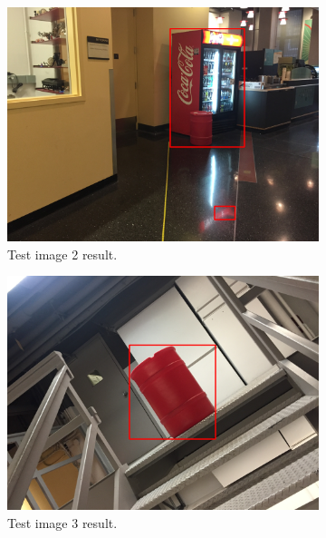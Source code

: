 \documentclass[a4paper]{article}
\begin{document}
\begin{figure}[!tbp]
  \centering
  \begin{subfigure}[b]{.4\textwidth}
    \includegraphics[width=1\textwidth]{test_image2.png}
\caption{\label{fig:test2}Test image 2 result.}
  \end{subfigure}
  \begin{subfigure}[b]{.4\textwidth}
    \includegraphics[width=1\textwidth]{test_image3.png}
\caption{\label{fig:test3}Test image 3 result.}
  \end{subfigure}
  \caption{\label{fig:test2_set}}
\end{figure}
\end{document}
